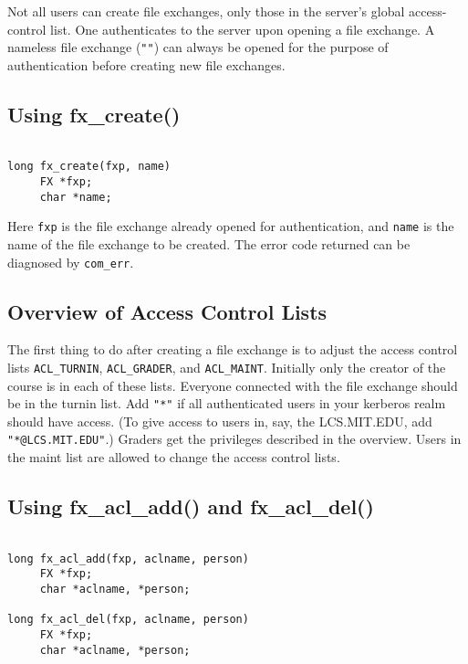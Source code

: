 Not all users can create file exchanges, only those in the server's
global access-control list.  One authenticates to the server upon
opening a file exchange.  A nameless file exchange (\verb+""+) can always be
opened for the purpose of authentication before creating new file
exchanges.

\subsection{Using fx\_create()}

\begin{verbatim}

long fx_create(fxp, name)
     FX *fxp;
     char *name;

\end{verbatim}

Here \verb+fxp+ is the file exchange already opened for
authentication, and \verb+name+ is the name of the file exchange to be
created.  The error code returned can be diagnosed by \verb+com_err+.

\subsection{Overview of Access Control Lists}

The first thing to do after creating a file exchange is to adjust the
access control lists \verb+ACL_TURNIN+, \verb+ACL_GRADER+, and
\verb+ACL_MAINT+.  Initially only the creator of the course is in
each of these lists.  Everyone connected with the file exchange should
be in the turnin list.  Add \verb+"*"+ if all authenticated users in
your kerberos realm should have access.  (To give access to users in,
say, the LCS.MIT.EDU, add \verb+"*@LCS.MIT.EDU"+.)  Graders get the
privileges described in the overview.  Users in the maint list are
allowed to change the access control lists.

\subsection{Using fx\_acl\_add() and fx\_acl\_del()}

\begin{verbatim}

long fx_acl_add(fxp, aclname, person)
     FX *fxp;
     char *aclname, *person;

long fx_acl_del(fxp, aclname, person)
     FX *fxp;
     char *aclname, *person;

\end{verbatim}

